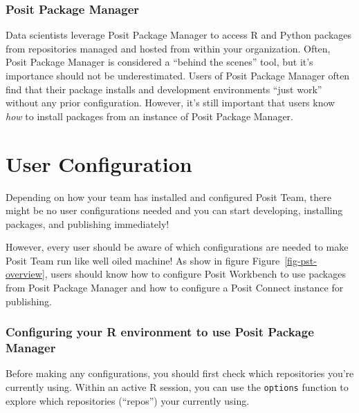 \documentclass[
  letterpaper,
  DIV=11,
  numbers=noendperiod]{scrreprt}
\newenvironment{Shaded}{\begin{snugshade}}{\end{snugshade}}
\newcommand{\FunctionTok}[1]{\textcolor[rgb]{0.28,0.35,0.67}{#1}}
\newcommand{\NormalTok}[1]{\textcolor[rgb]{0.00,0.23,0.31}{#1}}
\newcommand{\SpecialCharTok}[1]{\textcolor[rgb]{0.37,0.37,0.37}{#1}}
\newcommand{\StringTok}[1]{\textcolor[rgb]{0.13,0.47,0.30}{#1}}
\begin{document}
\subsection{Posit Package Manager}\label{posit-package-manager}

Data scientists leverage Posit Package Manager to access R and Python
packages from repositories managed and hosted from within your
organization. Often, Posit Package Manager is considered a ``behind the
scenes'' tool, but it's importance should not be underestimated. Users
of Posit Package Manager often find that their package installs and
development environments ``just work'' without any prior configuration.
However, it's still important that users know \emph{how} to install
packages from an instance of Posit Package Manager.

\chapter{User Configuration}\label{user-configuration}

Depending on how your team has installed and configured Posit Team,
there might be no user configurations needed and you can start
developing, installing packages, and publishing immediately!

However, every user should be aware of which configurations are needed
to make Posit Team run like well oiled machine! As show in figure
Figure~\ref{fig-pst-overview}, users should know how to configure Posit
Workbench to use packages from Posit Package Manager and how to
configure a Posit Connect instance for publishing.

\subsection{Configuring your R environment to use Posit Package
Manager}\label{configuring-your-r-environment-to-use-posit-package-manager}

Before making any configurations, you should first check which
repositories you're currently using. Within an active R session, you can
use the \texttt{options} function to explore which repositories
(``repos'') your currently using.

\begin{Shaded}
\end{Shaded}
\end{document}
